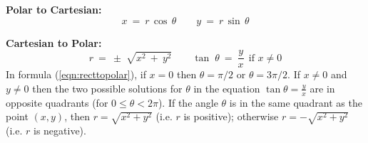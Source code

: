 \noindent\textbf{Polar to Cartesian:}
\begin{equation}\label{eqn:polartorect}
 x ~=~ r\,\cos\,\theta \qquad y ~=~ r\,\sin\,\theta
\end{equation}

\noindent\textbf{Cartesian to Polar:}
\begin{equation}\label{eqn:recttopolar}
 r ~=~ \pm\;\sqrt{x^2 ~+~ y^2} \qquad \tan\;\theta ~=~ \frac{y}{x} ~~\text{if $x \ne 0$}
\end{equation}\vspace{-2mm}
In formula (\ref{eqn:recttopolar}), if $x = 0$ then $\theta = \pi/2$
or $\theta = 3\pi/2$. If $x \ne 0$ and $y \ne 0$ then the two possible
solutions for $\theta$ in the equation $\tan \theta = \frac{y}{x}$ are in
opposite quadrants (for $0 \le \theta < 2\pi$). If the angle $\theta$ is in the 
same quadrant as the point $(x,y)$, then $r = \sqrt{x^2 + y^2}$ (i.e. $r$ is
positive); otherwise $r = -\sqrt{x^2 + y^2}$ (i.e. $r$ is negative).

